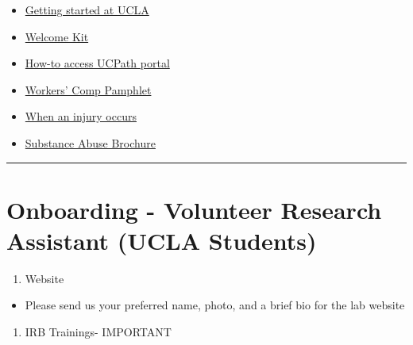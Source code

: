 \documentclass[]{book}
\providecommand{\tightlist}{%
  \setlength{\itemsep}{0pt}\setlength{\parskip}{0pt}}
\begin{document}
\begin{itemize}
\tightlist
\item
  \href{https://www.chr.ucla.edu/new-employee/getting-started}{Getting
  started at UCLA}
\item
  \href{https://ucnet.universityofcalifornia.edu/forms/pdf/welcome-kit.pdf}{Welcome
  Kit}
\item
  \href{https://www.centralresourceunit.ucla.edu/s/}{How-to access
  UCPath portal}
\item
  \href{https://ucla.app.box.com/s/jyzoag8v9qw6katuvgegjil8an2tsx2j}{Workers'
  Comp Pamphlet}
\item
  \href{https://ucla.app.box.com/s/nua4ypfpjlt1226fusney4zyvo6qzzhj}{When
  an injury occurs}
\item
  \href{https://ucla.app.box.com/s/qrj4j7bnca1r8fy9n1bdfdf6orf1g0dq}{Substance
  Abuse Brochure}
\end{itemize}

\begin{center}\rule{0.5\linewidth}{0.5pt}\end{center}

\section{Onboarding - Volunteer Research Assistant (UCLA
Students)}\label{onboarding---volunteer-research-assistant-ucla-students}

\begin{enumerate}
\def\labelenumi{\arabic{enumi}.}
\tightlist
\item
  Website
\end{enumerate}

\begin{itemize}
\tightlist
\item
  Please send us your preferred name, photo, and a brief bio for the lab
  website
\end{itemize}

\begin{enumerate}
\def\labelenumi{\arabic{enumi}.}
\setcounter{enumi}{1}
\tightlist
\item
  IRB Trainings- IMPORTANT
\end{enumerate}
\end{document}
